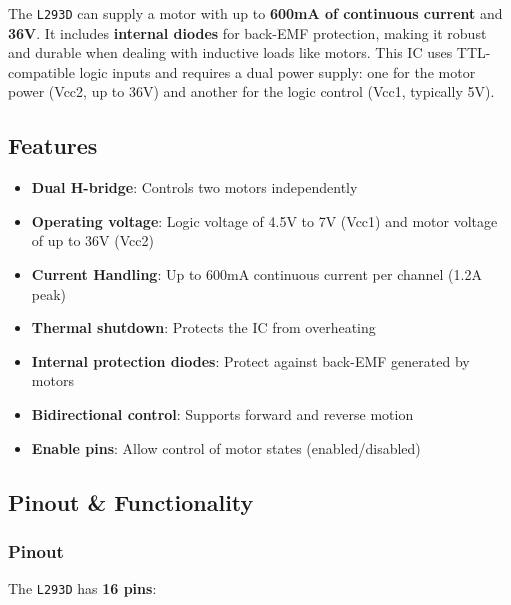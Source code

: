 \documentclass[a4paper,12pt]{article}
\begin{document}
The \texttt{L293D} can supply a motor with up to \textbf{600mA of continuous current} and \textbf{36V}. It includes \textbf{internal diodes} for back-EMF protection, making it robust and durable when dealing with inductive loads like motors. This IC uses TTL-compatible logic inputs and requires a dual power supply: one for the motor power (Vcc2, up to 36V) and another for the logic control (Vcc1, typically 5V).

\subsection{Features}
\begin{itemize}
    \item \textbf{Dual H-bridge}: Controls two motors independently
    \item \textbf{Operating voltage}: Logic voltage of 4.5V to 7V (Vcc1) and motor voltage of up to 36V (Vcc2)
    \item \textbf{Current Handling}: Up to 600mA continuous current per channel (1.2A peak)
    \item \textbf{Thermal shutdown}: Protects the IC from overheating
    \item \textbf{Internal protection diodes}: Protect against back-EMF generated by motors
    \item \textbf{Bidirectional control}: Supports forward and reverse motion
    \item \textbf{Enable pins}: Allow control of motor states (enabled/disabled)
\end{itemize}

\subsection{Pinout \& Functionality}
\subsubsection{Pinout}
The \texttt{L293D} has \textbf{16 pins}:
\end{document}
